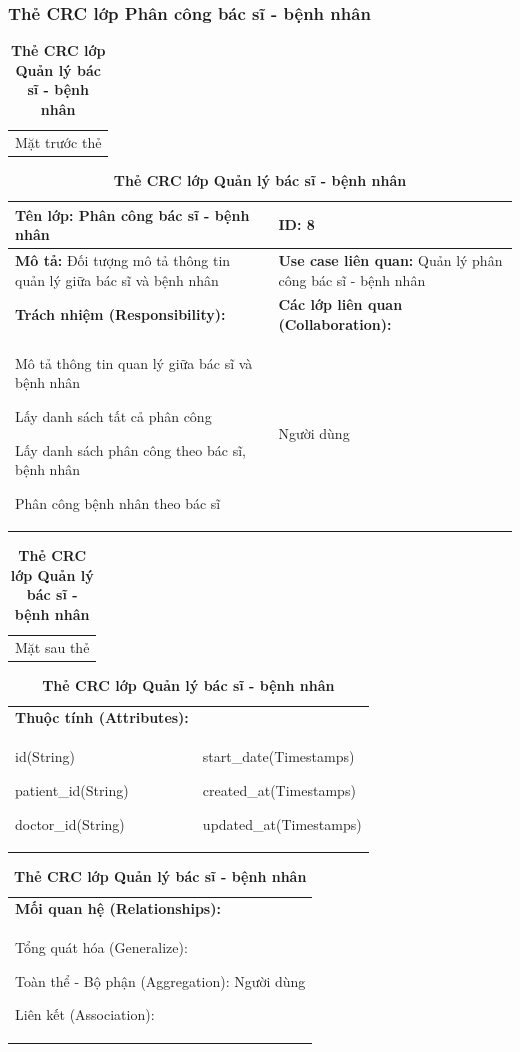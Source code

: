 \subsubsection{Thẻ CRC lớp Phân công bác sĩ - bệnh nhân}
  \begin{table}[H]
    \caption{\bfseries \fontsize{12pt}{0pt}\selectfont Thẻ CRC lớp Quản lý bác sĩ - bệnh nhân}
    \centering
    \begin{tabularx}{0.9\textwidth}{X}
      Mặt trước thẻ
    \end{tabularx}
    \begin{tabularx}{0.9\textwidth}{|X|X|}
      \hline
      \textbf{Tên lớp:} Phân công bác sĩ - bệnh nhân & \textbf{ID:} 8 \\
      \hline
      \textbf{Mô tả:} Đối tượng mô tả thông tin quản lý giữa bác sĩ và bệnh nhân & \textbf{Use case liên quan:} Quản lý phân công bác sĩ - bệnh nhân \\
      \hline
      \textbf{Trách nhiệm (Responsibility):} & \textbf{Các lớp liên quan (Collaboration):} \\
      Mô tả thông tin quan lý giữa bác sĩ và bệnh nhân

      Lấy danh sách tất cả phân công

      Lấy danh sách phân công theo bác sĩ, bệnh nhân

      Phân công bệnh nhân theo bác sĩ
      & 
      Người dùng
      \\
      \hline
    \end{tabularx}
    \begin{tabularx}{0.9\textwidth}{X}
      Mặt sau thẻ
    \end{tabularx}
    \begin{tabularx}{0.9\textwidth}{|X|X|}
      \hline
      \textbf{Thuộc tính (Attributes):} & \\
      id(String) 
      
      patient\_id(String)

      doctor\_id(String)
      & 
      start\_date(Timestamps) 
            
      created\_at(Timestamps)

      updated\_at(Timestamps)
      \\
      \hline
    \end{tabularx}
    \begin{tabularx}{0.9\textwidth}{|X|}
      \textbf{Mối quan hệ (Relationships):} \\
      Tổng quát hóa (Generalize):

      Toàn thể - Bộ phận (Aggregation): Người dùng
      
      Liên kết (Association):  
      \\
      \hline
    \end{tabularx}
  \end{table}

